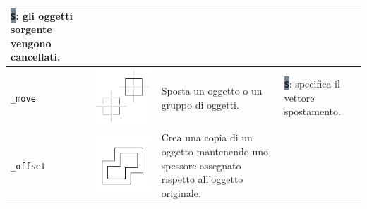 \documentclass[..]{../IEEEphot}
\newcommand{\param}[1]{\colorbox{LightSlateGray}{\color{Navy}\texttt{\textbf{#1}}}}
\begin{document}
\begin{center}
\begin{longtable}{m{.2\linewidth}m{.2\linewidth}m{.25\linewidth}m{.25\linewidth}}
\param{S}: gli oggetti sorgente vengono cancellati.
\\		
\midrule
\texttt{\_move} & \includegraphics[width = 0.8\linewidth, keepaspectratio]{../images/jpg/_move.jpg} & Sposta un oggetto o un gruppo di oggetti. & 
\param{S}: specifica il vettore spostamento.
\\			
\midrule
\texttt{\_offset} & \includegraphics[width = 0.8\linewidth, keepaspectratio]{../images/jpg/_offset.jpg} & Crea una copia di un oggetto mantenendo uno spessore assegnato rispetto all'oggetto originale.  & 
\\			
\midrule

\end{longtable}
\end{center}
\end{document}
